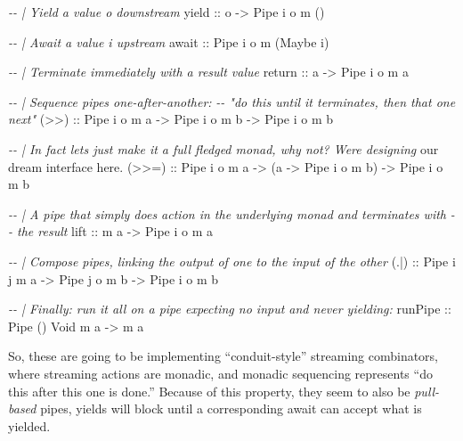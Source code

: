 \documentclass[]{article}
\newenvironment{Shaded}{}{}
\newcommand{\CommentTok}[1]{\textcolor[rgb]{0.38,0.63,0.69}{\textit{#1}}}
\newcommand{\DataTypeTok}[1]{\textcolor[rgb]{0.56,0.13,0.00}{#1}}
\newcommand{\FunctionTok}[1]{\textcolor[rgb]{0.02,0.16,0.49}{#1}}
\newcommand{\NormalTok}[1]{#1}
\newcommand{\OperatorTok}[1]{\textcolor[rgb]{0.40,0.40,0.40}{#1}}
\newcommand{\OtherTok}[1]{\textcolor[rgb]{0.00,0.44,0.13}{#1}}
\begin{document}
\begin{Shaded}
\begin{Highlighting}[]
\CommentTok{{-}{-} | Yield a value \textasciigrave{}o\textasciigrave{} downstream}
\OtherTok{yield ::}\NormalTok{ o }\OtherTok{{-}>} \DataTypeTok{Pipe}\NormalTok{ i o m ()}

\CommentTok{{-}{-} | Await a value \textasciigrave{}i\textasciigrave{} upstream}
\OtherTok{await ::} \DataTypeTok{Pipe}\NormalTok{ i o m (}\DataTypeTok{Maybe}\NormalTok{ i)}

\CommentTok{{-}{-} | Terminate immediately with a result value}
\FunctionTok{return}\OtherTok{ ::}\NormalTok{ a }\OtherTok{{-}>} \DataTypeTok{Pipe}\NormalTok{ i o m a}

\CommentTok{{-}{-} | Sequence pipes one{-}after{-}another:}
\CommentTok{{-}{-} "do this until it terminates, then that one next"}
\OtherTok{(>>) ::} \DataTypeTok{Pipe}\NormalTok{ i o m a }\OtherTok{{-}>} \DataTypeTok{Pipe}\NormalTok{ i o m b }\OtherTok{{-}>} \DataTypeTok{Pipe}\NormalTok{ i o m b}

\CommentTok{{-}{-} | In fact let\textquotesingle{}s just make it a full fledged monad, why not?  We\textquotesingle{}re designing}
\NormalTok{our dream interface here}\OperatorTok{.}
\OtherTok{(>>=) ::} \DataTypeTok{Pipe}\NormalTok{ i o m a }\OtherTok{{-}>}\NormalTok{ (a }\OtherTok{{-}>} \DataTypeTok{Pipe}\NormalTok{ i o m b) }\OtherTok{{-}>} \DataTypeTok{Pipe}\NormalTok{ i o m b}

\CommentTok{{-}{-} | A pipe that simply does action in the underlying monad and terminates with}
\CommentTok{{-}{-} the result}
\OtherTok{lift ::}\NormalTok{ m a }\OtherTok{{-}>} \DataTypeTok{Pipe}\NormalTok{ i o m a}

\CommentTok{{-}{-} | Compose pipes, linking the output of one to the input of the other}
\OtherTok{(.|) ::} \DataTypeTok{Pipe}\NormalTok{ i j m a }\OtherTok{{-}>} \DataTypeTok{Pipe}\NormalTok{ j o m b }\OtherTok{{-}>} \DataTypeTok{Pipe}\NormalTok{ i o m b}

\CommentTok{{-}{-} | Finally: run it all on a pipe expecting no input and never yielding:}
\OtherTok{runPipe ::} \DataTypeTok{Pipe}\NormalTok{ () }\DataTypeTok{Void}\NormalTok{ m a }\OtherTok{{-}>}\NormalTok{ m a}
\end{Highlighting}
\end{Shaded}

So, these are going to be implementing ``conduit-style'' streaming combinators,
where streaming actions are monadic, and monadic sequencing represents ``do this
after this one is done.'' Because of this property, they seem to also be
\emph{pull-based} pipes, yields will block until a corresponding await can
accept what is yielded.
\end{document}
